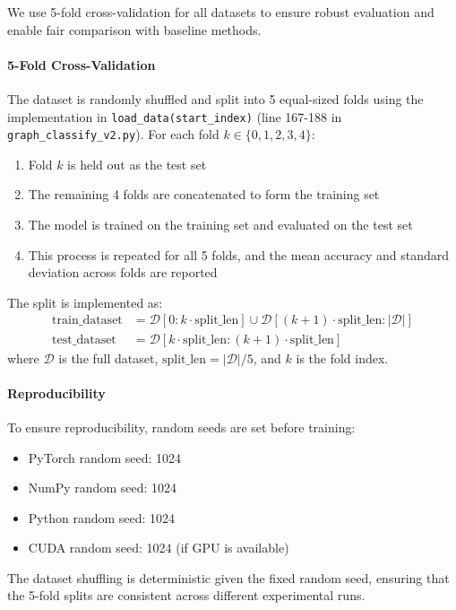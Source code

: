 We use 5-fold cross-validation for all datasets to ensure robust evaluation and enable fair comparison with baseline methods.

\paragraph{5-Fold Cross-Validation}
The dataset is randomly shuffled and split into 5 equal-sized folds using the implementation in \texttt{load\_data(start\_index)} (line 167-188 in \texttt{graph\_classify\_v2.py}). For each fold $k \in \{0, 1, 2, 3, 4\}$:
\begin{enumerate}
    \item Fold $k$ is held out as the test set
    \item The remaining 4 folds are concatenated to form the training set
    \item The model is trained on the training set and evaluated on the test set
    \item This process is repeated for all 5 folds, and the mean accuracy and standard deviation across folds are reported
\end{enumerate}

The split is implemented as:
\begin{equation}
\begin{aligned}
\text{train\_dataset} &= \mathcal{D}[0:k \cdot \text{split\_len}] \cup \mathcal{D}[(k+1) \cdot \text{split\_len}:|\mathcal{D}|] \\
\text{test\_dataset} &= \mathcal{D}[k \cdot \text{split\_len}:(k+1) \cdot \text{split\_len}]
\end{aligned}
\end{equation}
where $\mathcal{D}$ is the full dataset, $\text{split\_len} = |\mathcal{D}| / 5$, and $k$ is the fold index.

\paragraph{Reproducibility}
To ensure reproducibility, random seeds are set before training:
\begin{itemize}
    \item PyTorch random seed: 1024
    \item NumPy random seed: 1024
    \item Python random seed: 1024
    \item CUDA random seed: 1024 (if GPU is available)
\end{itemize}
The dataset shuffling is deterministic given the fixed random seed, ensuring that the 5-fold splits are consistent across different experimental runs.

